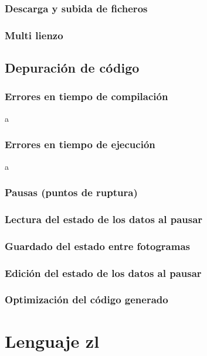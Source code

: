 \documentclass{report}
\begin{document}
	\subsection{Descarga y subida de ficheros}
	
	\subsection{Multi lienzo}
	
	\section{Depuración de código}
	
	\subsection{Errores en tiempo de compilación}
	
	a
	
	\subsection{Errores en tiempo de ejecución}
	
	a
	
	\subsection{Pausas (puntos de ruptura)}
	
	\subsection{Lectura del estado de los datos al pausar}
	
	\subsection{Guardado del estado entre fotogramas}
	
	\subsection{Edición del estado de los datos al pausar}
	
	\subsection{Optimización del código generado}
	
	\chapter{Lenguaje zl}
\end{document}
